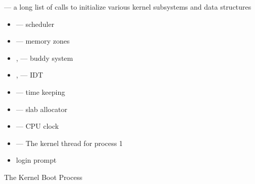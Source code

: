 \begin{frame}
  \begin{block}{ --- a long list of calls to initialize various
      kernel subsystems and data structures}
    \begin{itemize}
    \item {} --- scheduler
    \item {} --- memory zones
    \item {},  --- buddy
      system
    \item {},  --- IDT
    \item {} --- time keeping
    \item {} --- slab allocator
    \item {} --- CPU clock
    \item {} --- The kernel thread for process 1
    \item login prompt
    \end{itemize}
  \end{block}
\end{frame}


\begin{frame}{The Kernel Boot Process}
  \begin{center}
  \end{center}
\end{frame}

